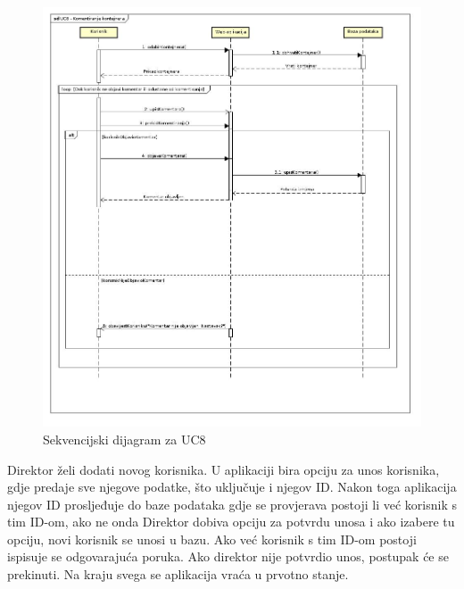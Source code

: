 			\eject
			
			\begin{figure}
				\centering
				\includegraphics[width=1.0\linewidth]{slike/UC8-seq.jpg}
				\caption{Sekvencijski dijagram za UC8}
				\label{fig:UC8-Seq}
			\end{figure}
			
			\clearpage
			
			\eject
			
			
			
			\noindent	Direktor želi dodati novog korisnika. U aplikaciji bira opciju za unos korisnika, gdje predaje sve njegove podatke, što uključuje i njegov ID. Nakon toga aplikacija njegov ID prosljeđuje do baze podataka gdje se provjerava postoji li već korisnik s tim ID-om, ako ne onda Direktor dobiva opciju za potvrdu unosa i ako izabere tu opciju, novi korisnik se unosi u bazu. Ako već korisnik s tim ID-om postoji ispisuje se odgovarajuća poruka. Ako direktor nije potvrdio unos, postupak će se prekinuti. Na kraju svega se aplikacija vraća u prvotno stanje.
			
